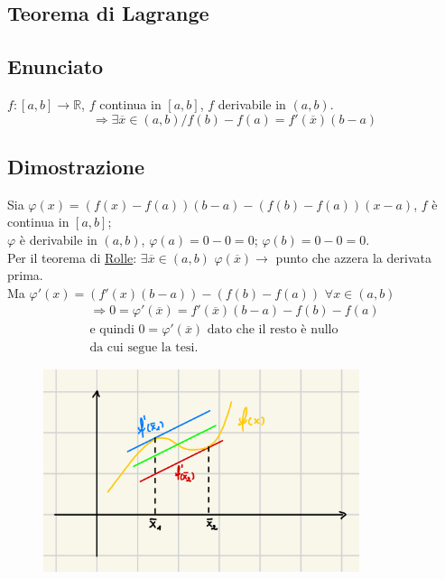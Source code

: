 \documentclass{article}
\newcommand{\R}{\mathbb{R}}
\begin{document}
\begin{flushleft}
\section{Teorema di Lagrange}
\subsection{Enunciato}
$f:[a,b] \rightarrow \R$, $f$ continua in $[a,b]$, $f$ derivabile in $(a,b)$.
\[ \Rightarrow \exists \overline{x} \in (a,b) / f(b) - f(a) = f'(\overline{x}) (b-a)\]

\subsection{Dimostrazione}
Sia $\varphi (x) = (f(x)- f(a))(b - a) - (f(b) - f(a))(x-a)$, $f$ è continua in $[a,b]$;
\\$\varphi$ è derivabile in $(a,b)$, $\varphi (a) = 0 - 0 = 0$; $\varphi (b) = 0 - 0 = 0$.
\\Per il teorema di \hyperref[Rolle]{Rolle}: $\exists \overline{x} \in (a,b)$ \hspace*{2em} $\varphi (\overline{x}) \rightarrow$ punto che azzera la derivata prima.
\\Ma $\varphi ' (x) = (f'(x)(b-a)) - (f(b)-f(a))$ $\forall x \in (a,b)$
\[
    \begin{array}{c}
        \Rightarrow 0 = \varphi ' (\overline{x}) = f'(\overline{x})(b-a) - f(b)-f(a) \\
        \text{e quindi } 0 = \varphi ' (\overline{x}) \text{ dato che il resto è nullo}\\
        \text{da cui segue la tesi.}
    \end{array}
\]

\begin{figure}[h]
    \centering
    \includegraphics[width=25em]{./images/lagrange.jpeg}
\end{figure}
\FloatBarrier



\end{flushleft}
\end{document}
